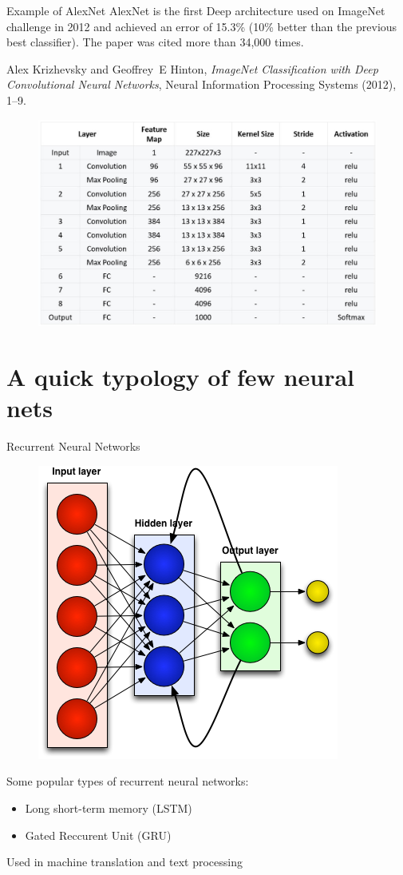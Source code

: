 \documentclass[handout]{beamer}
\begin{document}
\begin{frame}{Example of AlexNet}
    \alert{AlexNet} is the first Deep architecture used on ImageNet challenge in 2012 and achieved an \alert{error of 15.3\%} (10\% better than the previous best classifier). The paper was cited more than 34,000 times.

\begin{thebibliography}{GBC16}

Alex Krizhevsky and Geoffrey~E Hinton, \emph{{ImageNet Classification with Deep
  Convolutional Neural Networks}}, Neural Information Processing Systems
  (2012), 1--9.

\end{thebibliography}
    \begin{figure}
        \centering
        \includegraphics[width=.5\textwidth]{fig/L2/AlexNet_Summary_Table.jpg}

    \end{figure}
\end{frame}
\section{A quick typology of few neural nets}
\begin{frame}{Recurrent Neural Networks}
    \begin{figure}
        \centering
        \includegraphics[width=.4\textwidth]{fig/L2/rnn.png}

    \end{figure}

Some popular types of recurrent neural networks:
\begin{itemize}
    \item Long short-term memory (LSTM)
    \item Gated Reccurent Unit (GRU)
\end{itemize}
\alert{Used in machine translation and text processing}
\end{frame}
\end{document}
